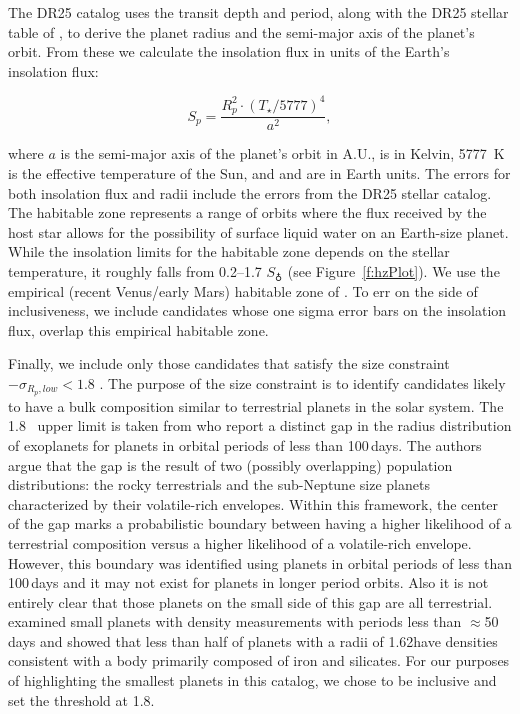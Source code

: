 The DR25 catalog uses the transit depth and period, along with the DR25 stellar table of \citet{Mathur2017ApJS}, to derive the planet radius and the semi-major axis of the planet's orbit.  From these we calculate the insolation flux in units of the Earth's insolation flux:

\begin{equation}
S_{p} = \frac{R_{p}^{2} \cdot (T_{\star}/5777)^{4}}{a^{2}} ,
\end{equation}

\noindent where $a$ is the semi-major axis of the planet's orbit in A.U., \tstar{} is in Kelvin, 5777~K is the effective temperature of the Sun, and \sp{} and \rp{} are in Earth units. The errors for both insolation flux and radii include the errors from the DR25 stellar catalog. The habitable zone represents a range of orbits where the flux received by the host star allows for the possibility of surface liquid water on an Earth-size planet.  While the insolation limits for the habitable zone depends on the stellar temperature, it roughly falls from 0.2--1.7 $S_{\earth}$ (see Figure~\ref{f:hzPlot}). We use the empirical (recent Venus/early Mars) habitable zone of \citet{Kopparapu2013}.  To err on the side of inclusiveness, we include candidates whose one sigma error bars on the insolation flux, overlap this empirical habitable zone.  

Finally, we include only those candidates that satisfy the size constraint \rp $- \sigma_{{R_p},low} < 1.8$ \re.  The purpose of the size constraint is to identify candidates likely to have a bulk composition similar to terrestrial planets in the solar system.  The 1.8 \re\ upper limit is taken from \citet{Fulton2017} who report a distinct gap in the radius distribution of exoplanets for planets in orbital periods of less than 100\,days.  The authors argue that the gap is the result of two (possibly overlapping) population distributions: the rocky terrestrials and the sub-Neptune size planets characterized by their volatile-rich envelopes.  Within this framework, the center of the gap marks a probabilistic boundary between having a higher likelihood of a terrestrial composition versus a higher likelihood of a volatile-rich envelope.  
{\color{blue}  However, this boundary was identified using planets in orbital periods of less than 100\,days and it may not exist for planets in longer period orbits. Also it is not entirely clear that those planets on the small side of this gap are all terrestrial. \citet{Rogers2015} examined small planets with density measurements with periods less than $\approx$50 days and showed that less than half of planets with a radii of 1.62\re have densities consistent with a body primarily composed of iron and silicates.  For our purposes of highlighting the smallest planets in this catalog, we chose to be inclusive and set the threshold at 1.8\re.
}

